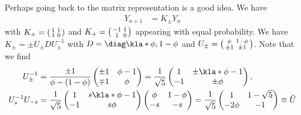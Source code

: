 \documentclass[english, parskip=full]{scrartcl}
\begin{document}
Perhaps going back to the matrix representation is a good idea.
We have
\begin{align}
Y_{n+1} &= K_\pm Y_n
\end{align}
with $K_+ = \begin{psmallmatrix}
1 & 1 \\ 1 & 0
\end{psmallmatrix}$ and $K_+ = \begin{psmallmatrix}
-1 & 1 \\ 1 & 0
\end{psmallmatrix}$ appearing with equal probability.
We have $K_\pm = \pm U_\pm D U_\pm^{-1}$ with $D=\diag\kla*{\phi, 1-\phi}$ and $U_\pm = \begin{psmallmatrix}
\phi & 1-\phi \\ \pm 1 & \pm 1
\end{psmallmatrix}$.
Note that we find
\begin{align}
U_\pm^{-1} &= \frac{\pm 1}{\phi - (1-\phi)} \begin{pmatrix}
\pm 1 & \phi-1 \\ \mp 1 & \phi
\end{pmatrix} = \frac{1}{\sqrt{5}} \begin{pmatrix}
1 & \pm \kla*{\phi-1} \\ -1 & \pm \phi
\end{pmatrix},\\
U_s^{-1} U_{-s} &= \frac{1}{\sqrt{5}} \begin{pmatrix}
1 & s \kla*{\phi-1} \\ -1 & s \phi
\end{pmatrix} \begin{pmatrix}
\phi & 1-\phi \\ -s & -s
\end{pmatrix} = \frac{1}{\sqrt{5}} \begin{pmatrix}
1 & 1-\sqrt{5} \\ -2\phi & -1
\end{pmatrix} \equiv \tilde{U}
\end{align}
\end{document}

